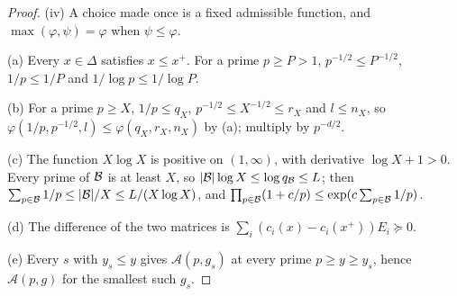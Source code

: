 \begin{proof}
(iv) A choice made once is a fixed admissible function, and
$\max(\varphi,\psi)=\varphi$ when $\psi\le\varphi$.

(a) Every $x\in\Delta$ satisfies $x\le x^+$. For a prime $p\ge P>1$,
$p^{-1/2}\le P^{-1/2}$, $1/p\le1/P$ and $1/\log p\le1/\log P$.

(b) For a prime $p\ge X$, $1/p\le q_X$, $p^{-1/2}\le X^{-1/2}\le r_X$ and
$l\le n_X$, so $\varphi(1/p,p^{-1/2},l)\le\varphi(q_X,r_X,n_X)$ by (a); multiply
by $p^{-d/2}$.

(c) The function $X\log X$ is positive on $(1,\infty)$, with derivative
$\log X+1>0$. Every prime of $\mathcal B$ is at least $X$, so
$|\mathcal B|\log X\le\log q_\mathcal B\le L$; then $\sum_{p\in\mathcal B}1/p\le|\mathcal B|/X\le
L/(X\log X)$, and $\prod_{p\in\mathcal B}(1+c/p)\le\exp(c\sum_{p\in\mathcal B}1/p)$.

(d) The difference of the two matrices is
$\sum_i(c_i(x)-c_i(x^+))E_i\succeq0$.

(e) Every $s$ with $y_s\le y$ gives $\mathcal A(p,g_s)$ at every prime
$p\ge y\ge y_s$, hence $\mathcal A(p,g)$ for the smallest such $g_s$.
\end{proof}

